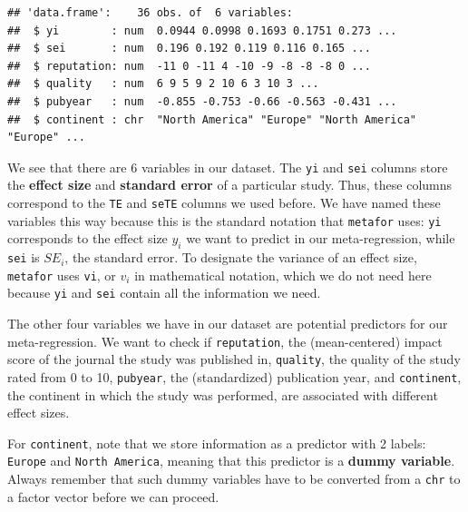 \documentclass[]{book}
\newenvironment{Shaded}{\begin{snugshade}}{\end{snugshade}}
\newcommand{\KeywordTok}[1]{\textcolor[rgb]{0.13,0.29,0.53}{\textbf{#1}}}
\newcommand{\NormalTok}[1]{#1}
\newcommand{\OperatorTok}[1]{\textcolor[rgb]{0.81,0.36,0.00}{\textbf{#1}}}
\newcommand{\StringTok}[1]{\textcolor[rgb]{0.31,0.60,0.02}{#1}}
\begin{document}
\begin{verbatim}
## 'data.frame':    36 obs. of  6 variables:
##  $ yi        : num  0.0944 0.0998 0.1693 0.1751 0.273 ...
##  $ sei       : num  0.196 0.192 0.119 0.116 0.165 ...
##  $ reputation: num  -11 0 -11 4 -10 -9 -8 -8 -8 0 ...
##  $ quality   : num  6 9 5 9 2 10 6 3 10 3 ...
##  $ pubyear   : num  -0.855 -0.753 -0.66 -0.563 -0.431 ...
##  $ continent : chr  "North America" "Europe" "North America" "Europe" ...
\end{verbatim}

We see that there are 6 variables in our dataset. The \texttt{yi} and \texttt{sei} columns store the \textbf{effect size} and \textbf{standard error} of a particular study. Thus, these columns correspond to the \texttt{TE} and \texttt{seTE} columns we used before. We have named these variables this way because this is the standard notation that \texttt{metafor} uses: \texttt{yi} corresponds to the effect size \(y_i\) we want to predict in our meta-regression, while \texttt{sei} is \(SE_i\), the standard error. To designate the variance of an effect size, \texttt{metafor} uses \texttt{vi}, or \(v_i\) in mathematical notation, which we do not need here because \texttt{yi} and \texttt{sei} contain all the information we need.

The other four variables we have in our dataset are potential predictors for our meta-regression. We want to check if \texttt{reputation}, the (mean-centered) impact score of the journal the study was published in, \texttt{quality}, the quality of the study rated from 0 to 10, \texttt{pubyear}, the (standardized) publication year, and \texttt{continent}, the continent in which the study was performed, are associated with different effect sizes.

For \texttt{continent}, note that we store information as a predictor with 2 labels: \texttt{Europe} and \texttt{North\ America}, meaning that this predictor is a \textbf{dummy variable}. Always remember that such dummy variables have to be converted from a \texttt{chr} to a factor vector before we can proceed.

\begin{Shaded}
\end{Shaded}
\end{document}
